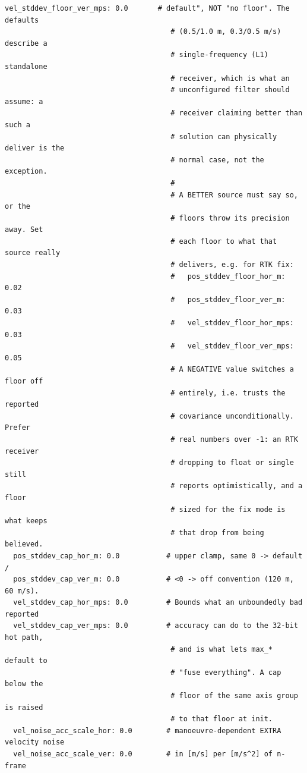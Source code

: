 \documentclass[11pt,a4paper]{article}
\begin{document}
\begin{lstlisting}[style=cfg]
  vel_stddev_floor_ver_mps: 0.0       # default", NOT "no floor". The defaults
                                       # (0.5/1.0 m, 0.3/0.5 m/s) describe a
                                       # single-frequency (L1) standalone
                                       # receiver, which is what an
                                       # unconfigured filter should assume: a
                                       # receiver claiming better than such a
                                       # solution can physically deliver is the
                                       # normal case, not the exception.
                                       #
                                       # A BETTER source must say so, or the
                                       # floors throw its precision away. Set
                                       # each floor to what that source really
                                       # delivers, e.g. for RTK fix:
                                       #   pos_stddev_floor_hor_m: 0.02
                                       #   pos_stddev_floor_ver_m: 0.03
                                       #   vel_stddev_floor_hor_mps: 0.03
                                       #   vel_stddev_floor_ver_mps: 0.05
                                       # A NEGATIVE value switches a floor off
                                       # entirely, i.e. trusts the reported
                                       # covariance unconditionally. Prefer
                                       # real numbers over -1: an RTK receiver
                                       # dropping to float or single still
                                       # reports optimistically, and a floor
                                       # sized for the fix mode is what keeps
                                       # that drop from being believed.
  pos_stddev_cap_hor_m: 0.0           # upper clamp, same 0 -> default /
  pos_stddev_cap_ver_m: 0.0           # <0 -> off convention (120 m, 60 m/s).
  vel_stddev_cap_hor_mps: 0.0         # Bounds what an unboundedly bad reported
  vel_stddev_cap_ver_mps: 0.0         # accuracy can do to the 32-bit hot path,
                                       # and is what lets max_* default to
                                       # "fuse everything". A cap below the
                                       # floor of the same axis group is raised
                                       # to that floor at init.
  vel_noise_acc_scale_hor: 0.0        # manoeuvre-dependent EXTRA velocity noise
  vel_noise_acc_scale_ver: 0.0        # in [m/s] per [m/s^2] of n-frame

\end{lstlisting}
\end{document}
